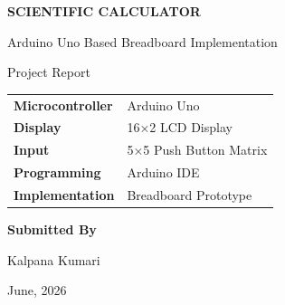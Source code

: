 \documentclass[12pt,a4paper]{article}
\begin{document}

\begin{titlepage}

\centering

\vspace*{2cm}

{\Huge\bfseries SCIENTIFIC CALCULATOR}

\vspace{0.3cm}

{\Large Arduino Uno Based Breadboard Implementation}

\vspace{1.5cm}

{\Large Project Report}

\vspace{1.8cm}

\begin{tabular}{ll}
\textbf{Microcontroller} & Arduino Uno\\
\textbf{Display} & 16×2 LCD Display\\
\textbf{Input} & 5×5 Push Button Matrix\\
\textbf{Programming} & Arduino IDE\\
\textbf{Implementation} & Breadboard Prototype\\
\end{tabular}

\vfill

\textbf{\Large Submitted By}

\vspace{0.3cm}

Kalpana Kumari

June, 2026

\end{titlepage}


\tableofcontents

\newpage

\end{document}

